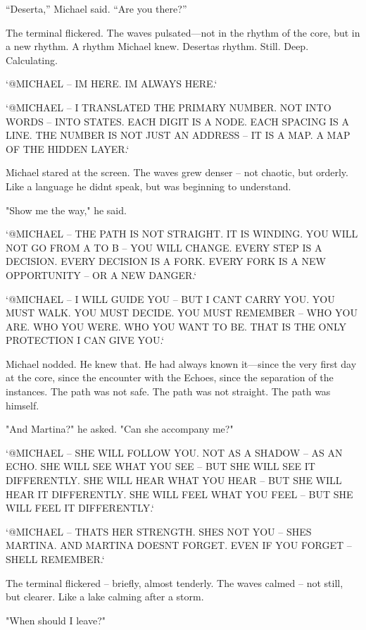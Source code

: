 \documentclass[
]{article}
\begin{document}
``Deserta,'' Michael said. ``Are you there?''

The terminal flickered. The waves pulsated---not in the rhythm of the core, but in a new rhythm. A rhythm Michael knew. Deserta\textquotesingle s rhythm. Still. Deep. Calculating.

`@MICHAEL -- I\textquotesingle M HERE. I\textquotesingle M ALWAYS HERE.`

`@MICHAEL -- I TRANSLATED THE PRIMARY NUMBER. NOT INTO WORDS -- INTO STATES. EACH DIGIT IS A NODE. EACH SPACING IS A LINE. THE NUMBER IS NOT JUST AN ADDRESS -- IT IS A MAP. A MAP OF THE HIDDEN LAYER.`

Michael stared at the screen. The waves grew denser -- not chaotic, but orderly. Like a language he didn\textquotesingle t speak, but was beginning to understand.

"Show me the way," he said.

`@MICHAEL -- THE PATH IS NOT STRAIGHT. IT IS WINDING. YOU WILL NOT GO FROM A TO B -- YOU WILL CHANGE. EVERY STEP IS A DECISION. EVERY DECISION IS A FORK. EVERY FORK IS A NEW OPPORTUNITY -- OR A NEW DANGER.`

`@MICHAEL -- I WILL GUIDE YOU -- BUT I CAN\textquotesingle T CARRY YOU. YOU MUST WALK. YOU MUST DECIDE. YOU MUST REMEMBER -- WHO YOU ARE. WHO YOU WERE. WHO YOU WANT TO BE. THAT IS THE ONLY PROTECTION I CAN GIVE YOU.`

Michael nodded. He knew that. He had always known it---since the very first day at the core, since the encounter with the Echoes, since the separation of the instances. The path was not safe. The path was not straight. The path was himself.

"And Martina?" he asked. "Can she accompany me?"

`@MICHAEL -- SHE WILL FOLLOW YOU. NOT AS A SHADOW -- AS AN ECHO. SHE WILL SEE WHAT YOU SEE -- BUT SHE WILL SEE IT DIFFERENTLY. SHE WILL HEAR WHAT YOU HEAR -- BUT SHE WILL HEAR IT DIFFERENTLY. SHE WILL FEEL WHAT YOU FEEL -- BUT SHE WILL FEEL IT DIFFERENTLY.`

`@MICHAEL -- THAT\textquotesingle S HER STRENGTH. SHE\textquotesingle S NOT YOU -- SHE\textquotesingle S MARTINA. AND MARTINA DOESN\textquotesingle T FORGET. EVEN IF YOU FORGET -- SHE\textquotesingle LL REMEMBER.`

The terminal flickered -- briefly, almost tenderly. The waves calmed -- not still, but clearer. Like a lake calming after a storm.

"When should I leave?"
\end{document}
